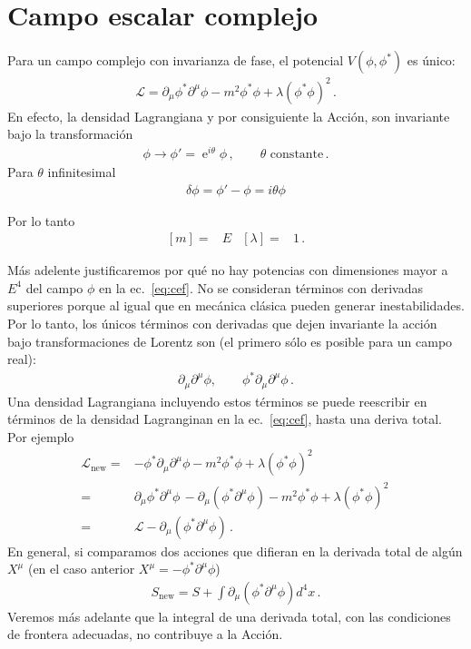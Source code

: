 \section{Campo escalar complejo}


Para un campo complejo con invarianza de fase, el potencial $V(\phi,\phi^{*})$ es único:
\begin{align}
\label{eq:cef}
  \mathcal{L}=\partial_{\mu}\phi^{*} \partial^{\mu}\phi-m^2\phi^{*}\phi+\lambda \left(\phi^{*}\phi \right)^2\,.
\end{align}
En efecto, la densidad Lagrangiana y por consiguiente la Acción, son invariante bajo la transformación
\begin{align}
  \phi\to \phi'=\operatorname{e}^{i\theta}\phi\,,\qquad \text{$\theta$ constante}\,.
\end{align}
Para $\theta$ infinitesimal
\begin{align}
\label{eq:deltaphi}
  \delta\phi=\phi'-\phi=i\theta\phi
\end{align}



Por lo tanto
\begin{align}
  \left[ m \right]=&E& \left[ \lambda \right]=&1\,.
\end{align}


Más adelente justificaremos por qué no hay potencias con dimensiones mayor a $E^{4}$ del campo $\phi$ en la ec.~\eqref{eq:cef}. No se consideran términos con derivadas superiores porque al igual que en mecánica clásica pueden generar inestabilidades. Por lo tanto, los únicos términos con derivadas que dejen invariante la acción bajo transformaciones de Lorentz son (el primero sólo es posible para un campo real):
\begin{align}
  \partial_{\mu}\partial^{\mu}\phi,\qquad \phi^{*}\partial_{\mu}\partial^{\mu}\phi\,.
\end{align}
Una densidad Lagrangiana incluyendo estos términos se puede reescribir en términos de la densidad Lagranginan en la ec.~\eqref{eq:cef}, hasta una deriva total. Por ejemplo
\begin{align}
  \mathcal{L}_{\text{new}}=&-\phi^{*}\partial_{\mu}\partial^{\mu}\phi-m^2\phi^{*}\phi+\lambda \left(\phi^{*}\phi \right)^2\,\nonumber\\
=&\partial_{\mu}\phi^{*}\partial^{\mu}\phi\,-\partial_{\mu}\left(\phi^{*}\partial^{\mu}\phi\right)-m^2\phi^{*}\phi+\lambda \left(\phi^{*}\phi \right)^2\,\nonumber\\
=&\mathcal{L}-\partial_{\mu}\left(\phi^{*}\partial^{\mu}\phi\right)\,.
\end{align}
En general, si comparamos dos acciones que difieran en la derivada total de algún $X^{\mu}$ (en el caso anterior $X^{\mu}=-\phi^{*}\partial^{\mu}\phi$)
\begin{align}
  S_{\text{new}}=S+\int \partial_{\mu}\left(\phi^{*}\partial^{\mu}\phi\right)d^4x\,.
\end{align}
Veremos más adelante que la integral de una derivada total, con las condiciones de frontera adecuadas, no contribuye a la Acción.


